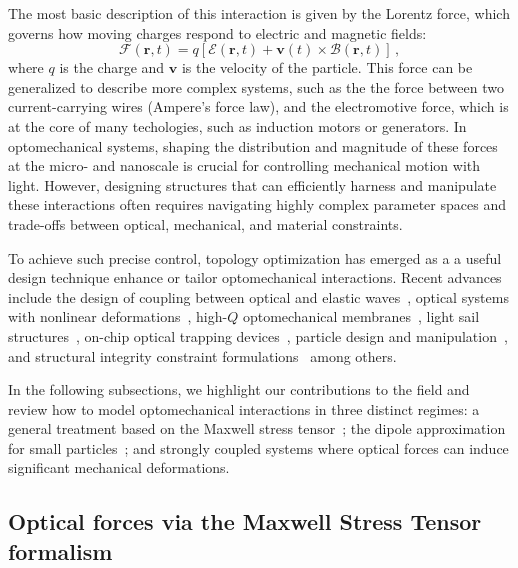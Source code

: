 The most basic description of this interaction is given by the Lorentz force, which governs how moving charges respond to electric and magnetic fields:
\begin{equation}\label{eq:lorentz_f}
    \mathbf{\bm{\mathcal{F}}}(\mathbf{r},t) = q \left[ \bm{\mathcal{E}}(\mathbf{r},t) + \mathbf{v}(t) \times \bm{\mathcal{B}}(\mathbf{r},t) \right]\,,
\end{equation}
where $q$ is the charge and $\mathbf{v}$ is the velocity of the particle. This force can be generalized to describe more complex systems,
such as the the force between two current-carrying 
wires (Ampere's force law), and the electromotive force, which is at the core of many techologies, such as induction motors or generators.
In optomechanical systems, shaping the distribution and magnitude of these forces at the micro- and nanoscale is crucial for controlling mechanical motion with light. 
However, designing structures that can efficiently harness and manipulate these interactions often requires navigating highly complex
 parameter spaces and trade-offs between optical, mechanical, and material constraints.

To achieve such precise control, topology optimization has emerged as a a useful design technique enhance or tailor optomechanical interactions.
Recent advances include the design of coupling between optical and elastic
 waves~\cite{photo_topopt}, optical systems with nonlinear deformations~\cite{def_wg}, high-$Q$ optomechanical membranes~\cite{highQ1, fengwen, aragon1},
light sail structures~\cite{lightsail_topopt, lightsail_topopt1},
on-chip optical trapping devices~\cite{ownpub1}, particle design and manipulation~\cite{ownpub2, particle_opt},
and structural integrity constraint formulations~\cite{structural_integrity}
 among others.

 In the following subsections, we highlight our contributions to the field and review how to model optomechanical interactions in three distinct regimes: a general treatment based on the Maxwell stress tensor~\cite{ownpub2}; 
 the dipole approximation for small particles~\cite{ownpub1, ownpub3}; and strongly coupled systems where optical forces can induce significant mechanical deformations.
\subsection*{Optical forces via the Maxwell Stress Tensor formalism~\cite{ownpub3}}

